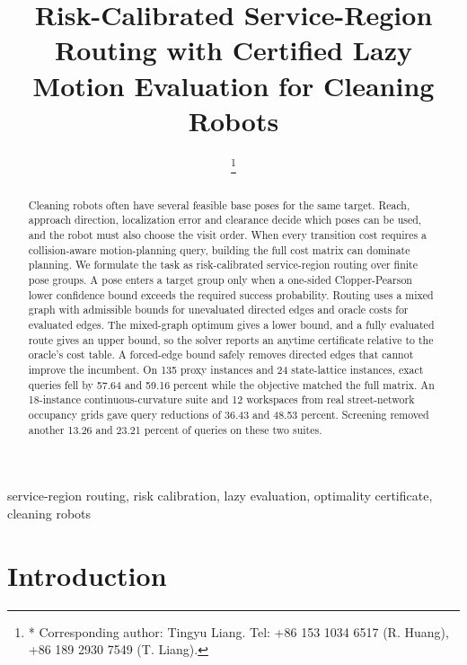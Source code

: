 \documentclass[conference]{IEEEtran}
\begin{document}
\title{Risk-Calibrated Service-Region Routing with Certified Lazy Motion Evaluation for Cleaning Robots}

\author{
\thanks{* Corresponding author: Tingyu Liang. Tel: +86 153 1034 6517 (R. Huang), +86 189 2930 7549 (T. Liang).}
}

\maketitle

\begin{abstract}
Cleaning robots often have several feasible base poses for the same target. Reach, approach direction, localization error and clearance decide which poses can be used, and the robot must also choose the visit order. When every transition cost requires a collision-aware motion-planning query, building the full cost matrix can dominate planning. We formulate the task as risk-calibrated service-region routing over finite pose groups. A pose enters a target group only when a one-sided Clopper-Pearson lower confidence bound exceeds the required success probability. Routing uses a mixed graph with admissible bounds for unevaluated directed edges and oracle costs for evaluated edges. The mixed-graph optimum gives a lower bound, and a fully evaluated route gives an upper bound, so the solver reports an anytime certificate relative to the oracle's cost table. A forced-edge bound safely removes directed edges that cannot improve the incumbent. On 135 proxy instances and 24 state-lattice instances, exact queries fell by 57.64 and 59.16 percent while the objective matched the full matrix. An 18-instance continuous-curvature suite and 12 workspaces from real street-network occupancy grids gave query reductions of 36.43 and 48.53 percent. Screening removed another 13.26 and 23.21 percent of queries on these two suites.
\end{abstract}

\begin{IEEEkeywords}
service-region routing, risk calibration, lazy evaluation, optimality certificate, cleaning robots
\end{IEEEkeywords}

\section{Introduction}
\end{document}
